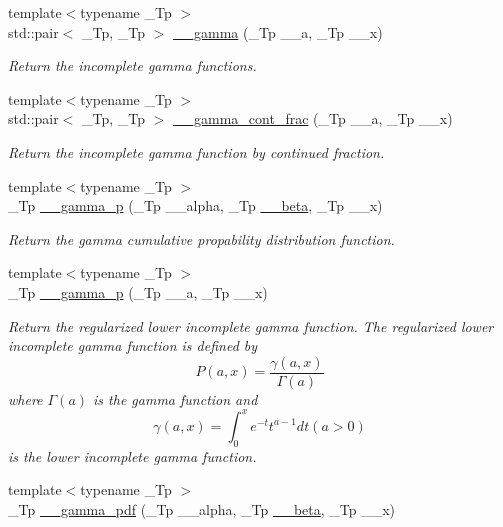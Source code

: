 \begin{DoxyCompactItemize}
{\footnotesize template$<$typename \+\_\+\+Tp $>$ }\\std\+::pair$<$ \+\_\+\+Tp, \+\_\+\+Tp $>$ \hyperlink{namespacestd_1_1____detail_a00ade496acee116fb7990d20ff4be762}{\+\_\+\+\_\+gamma} (\+\_\+\+Tp \+\_\+\+\_\+a, \+\_\+\+Tp \+\_\+\+\_\+x)
\begin{DoxyCompactList}\small\item\em Return the incomplete gamma functions. \end{DoxyCompactList}\item 
{\footnotesize template$<$typename \+\_\+\+Tp $>$ }\\std\+::pair$<$ \+\_\+\+Tp, \+\_\+\+Tp $>$ \hyperlink{namespacestd_1_1____detail_afd6319747af991947a02388acee40c26}{\+\_\+\+\_\+gamma\+\_\+cont\+\_\+frac} (\+\_\+\+Tp \+\_\+\+\_\+a, \+\_\+\+Tp \+\_\+\+\_\+x)
\begin{DoxyCompactList}\small\item\em Return the incomplete gamma function by continued fraction. \end{DoxyCompactList}\item 
{\footnotesize template$<$typename \+\_\+\+Tp $>$ }\\\+\_\+\+Tp \hyperlink{namespacestd_1_1____detail_a33f9cf005ecdad199024712cc89c0bc6}{\+\_\+\+\_\+gamma\+\_\+p} (\+\_\+\+Tp \+\_\+\+\_\+alpha, \+\_\+\+Tp \hyperlink{namespacestd_1_1____detail_a090d2f0920e0d208c467609b2a81d717}{\+\_\+\+\_\+beta}, \+\_\+\+Tp \+\_\+\+\_\+x)
\begin{DoxyCompactList}\small\item\em Return the gamma cumulative propability distribution function. \end{DoxyCompactList}\item 
{\footnotesize template$<$typename \+\_\+\+Tp $>$ }\\\+\_\+\+Tp \hyperlink{namespacestd_1_1____detail_a4583981bd73c3d3bba970c2f91dc4ba5}{\+\_\+\+\_\+gamma\+\_\+p} (\+\_\+\+Tp \+\_\+\+\_\+a, \+\_\+\+Tp \+\_\+\+\_\+x)
\begin{DoxyCompactList}\small\item\em Return the regularized lower incomplete gamma function. The regularized lower incomplete gamma function is defined by \[ P(a,x) = \frac{\gamma(a,x)}{\Gamma(a)} \] where $ \Gamma(a) $ is the gamma function and \[ \gamma(a,x) = \int_0^x e^{-t}t^{a-1}dt (a > 0) \] is the lower incomplete gamma function. \end{DoxyCompactList}\item 
{\footnotesize template$<$typename \+\_\+\+Tp $>$ }\\\+\_\+\+Tp \hyperlink{namespacestd_1_1____detail_a13146321e4e094815de990c33b83b02a}{\+\_\+\+\_\+gamma\+\_\+pdf} (\+\_\+\+Tp \+\_\+\+\_\+alpha, \+\_\+\+Tp \hyperlink{namespacestd_1_1____detail_a090d2f0920e0d208c467609b2a81d717}{\+\_\+\+\_\+beta}, \+\_\+\+Tp \+\_\+\+\_\+x)

\end{DoxyCompactItemize}
